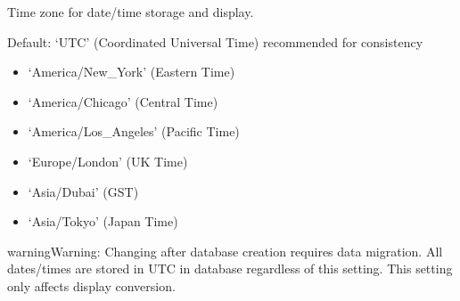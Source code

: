 \documentclass[letterpaper,10pt,english]{sphinxmanual}
\begin{document}

\begin{fulllineitems}
\label{\detokenize{softwareProject:softwareProject.settings.TIME_ZONE}}
\pysigstartsignatures
\pysigline
{}
\pysigstopsignatures
\sphinxAtStartPar
Time zone for date/time storage and display.

\sphinxAtStartPar
Default: ‘UTC’ (Coordinated Universal Time) \sphinxhyphen{} recommended for consistency
\begin{description}
\begin{itemize}
\item {} 
\sphinxAtStartPar
‘America/New\_York’ (Eastern Time)

\item {} 
\sphinxAtStartPar
‘America/Chicago’ (Central Time)

\item {} 
\sphinxAtStartPar
‘America/Los\_Angeles’ (Pacific Time)

\item {} 
\sphinxAtStartPar
‘Europe/London’ (UK Time)

\item {} 
\sphinxAtStartPar
‘Asia/Dubai’ (GST)

\item {} 
\sphinxAtStartPar
‘Asia/Tokyo’ (Japan Time)

\end{itemize}

\end{description}

\begin{sphinxadmonition}{warning}{Warning:}
\sphinxAtStartPar
Changing after database creation requires data migration.
All dates/times are stored in UTC in database regardless of this setting.
This setting only affects display conversion.
\end{sphinxadmonition}

\end{fulllineitems}

\end{document}
